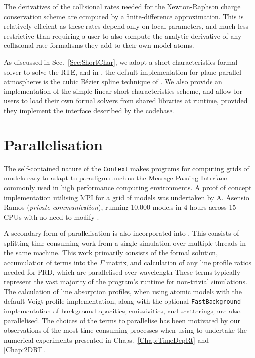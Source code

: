 The derivatives of the collisional rates needed for the Newton-Raphson charge conservation scheme are computed by a finite-difference approximation.
This is relatively efficient as these rates depend only on local parameters, and much less restrictive than requiring a user to also compute the analytic derivative of any collisional rate formalisms they add to their own model atoms.

As discussed in Sec.~\ref{Sec:ShortChar}, we adopt a short-characteristics formal solver to solve the RTE, and in \Lw{}, the default implementation for plane-parallel atmospheres is the cubic Bézier spline technique of \citet{DelaCruzRodriguez2013}.
We also provide an implementation of the simple linear short-characteristics scheme, and allow for users to load their own formal solvers from shared libraries at runtime, provided they implement the interface described by the \Lw{} codebase.

\section{Parallelisation}\label{Sec:LwParallelisation}

The self-contained nature of the \texttt{Context} makes \Lw{} programs for computing grids of models easy to adapt to paradigms such as the Message Passing Interface \citep[MPI, e.g.][for an overview of the MPICH implementation]{Gropp1996} commonly used in high performance computing environments.
A proof of concept implementation utilising MPI for a grid of models was undertaken by A. Asensio Ramos (\emph{private communication}), running 10,000 models in 4 hours across 15 CPUs with no need to modify \Lw{}.

A secondary form of parallelisation is also incorporated into \Lw{}.
This consists of splitting time-consuming work from a single simulation over multiple threads in the same machine.
This work primarily consists of the formal solution, accumulation of terms into the $\Gamma$ matrix, and calculation of any line profile ratios needed for PRD, which are parallelised over wavelength
These terms typically represent the vast majority of the program's runtime for non-trivial simulations.
The calculation of line absorption profiles, when using atomic models with the default Voigt profile implementation, along with the optional \texttt{FastBackground} implementation of background opacities, emissivities, and scatterings, are also parallelised.
The choices of the terms to parallelise has been motivated by our observations of the most time-consuming processes when using \Lw{} to undertake the numerical experiments presented in Chaps.~\ref{Chap:TimeDepRt} and \ref{Chap:2DRT}.


